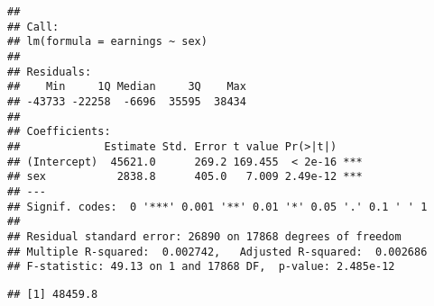 \documentclass[
]{article}
\newenvironment{Shaded}{\begin{snugshade}}{\end{snugshade}}
\newcommand{\CommentTok}[1]{\textcolor[rgb]{0.56,0.35,0.01}{\textit{#1}}}
\newcommand{\FloatTok}[1]{\textcolor[rgb]{0.00,0.00,0.81}{#1}}
\begin{document}
\begin{verbatim}
## 
## Call:
## lm(formula = earnings ~ sex)
## 
## Residuals:
##    Min     1Q Median     3Q    Max 
## -43733 -22258  -6696  35595  38434 
## 
## Coefficients:
##             Estimate Std. Error t value Pr(>|t|)    
## (Intercept)  45621.0      269.2 169.455  < 2e-16 ***
## sex           2838.8      405.0   7.009 2.49e-12 ***
## ---
## Signif. codes:  0 '***' 0.001 '**' 0.01 '*' 0.05 '.' 0.1 ' ' 1
## 
## Residual standard error: 26890 on 17868 degrees of freedom
## Multiple R-squared:  0.002742,   Adjusted R-squared:  0.002686 
## F-statistic: 49.13 on 1 and 17868 DF,  p-value: 2.485e-12
\end{verbatim}

\begin{Shaded}
\end{Shaded}

\begin{verbatim}
## [1] 48459.8
\end{verbatim}
\end{document}
